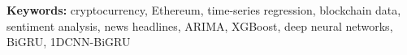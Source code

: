 \documentclass[ %
                    author={Raj Dhakan},
                supervisor={Dr. Ayush Joshi},
                    degree={MSc},
                     title={Ethereum Price Prediction using Internal and External Factors},
                  subtitle={},
                      type={},
                      year={2025}]{dissertation}
\begin{document}





\vspace{0.2cm}

\noindent \textbf{Keywords:} cryptocurrency, Ethereum, time-series regression, blockchain data, sentiment analysis, news headlines, ARIMA, XGBoost, deep neural networks, BiGRU, 1DCNN-BiGRU
\end{document}

